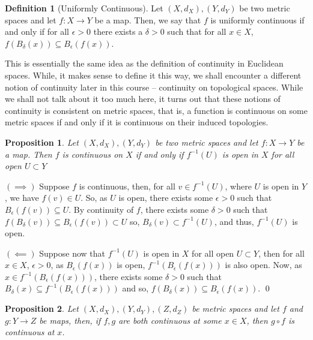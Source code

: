 \documentclass[
]{article}
\newtheorem{prop}{Proposition}
\theoremstyle{definition}
\newtheorem{definition}{Definition}[section]
\begin{document}
\begin{definition}[Uniformly Continuous]
  Let \((X, d_X), (Y, d_Y)\) be two metric spaces and let \(f : X \to Y\) be 
  a map. Then, we say that \(f\) is uniformly continuous if and only if 
  for all \(\epsilon > 0\) there exists a \(\delta > 0\) such that for 
  all \(x \in X\), \(f(B_\delta(x)) \subseteq B_\epsilon(f(x))\).  
\end{definition}

This is essentially the same idea as the definition of continuity in
Euclidean spaces. While, it makes sense to define it this way, we shall
encounter a different notion of continuity later in this course --
continuity on topological spaces. While we shall not talk about it too
much here, it turns out that these notions of continuity is consistent
on metric spaces, that is, a function is continuous on some metric
spaces if and only if it is continuous on their induced topologies.

\begin{prop}
  Let \((X, d_X), (Y, d_Y)\) be two metric spaces and let \(f : X \to Y\) be 
  a map. Then \(f\) is continuous on \(X\) if and only if \(f^{-1}(U)\) is open 
  in \(X\) for all open \(U \subset Y\)
\end{prop}
\proof

\((\implies)\) Suppose \(f\) is continuous, then, for all
\(v \in f^{-1}(U)\), where \(U\) is open in \(Y\), we have
\(f(v) \in U\). So, as \(U\) is open, there exists some \(\epsilon > 0\)
such that \(B_\epsilon(f(v)) \subseteq U\). By continuity of \(f\),
there exists some \(\delta > 0\) such that
\(f(B_\delta(v)) \subseteq B_\epsilon(f(v)) \subset U\) so,
\(B_\delta(v) \subset f^{-1}(U)\), and thus, \(f^{-1}(U)\) is open.

\((\impliedby)\) Suppose now that \(f^{-1}(U)\) is open in \(X\) for all
open \(U \subset Y\), then for all \(x \in X\), \(\epsilon > 0\), as
\(B_\epsilon(f(x))\) is open, \(f^{-1}(B_\epsilon(f(x)))\) is also open.
Now, as \(x \in f^{-1}(B_\epsilon(f(x)))\), there exists some
\(\delta > 0\) such that
\(B_\delta(x) \subseteq f^{-1}(B_\epsilon(f(x)))\) and so,
\(f(B_\delta(x)) \subseteq B_\epsilon(f(x))\). \qed

\begin{prop}
  Let \((X, d_X), (Y, d_Y), (Z, d_Z)\) be metric spaces and let 
  \(f\) and \(g : Y \to Z\) be maps, then, if \(f, g\) are both continuous at 
  some \(x \in X\), then \(g \circ f\) is continuous at \(x\).
\end{prop}
\proof
\end{document}
